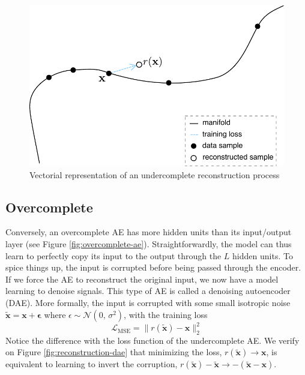 \begin{figure}[!h]
\centering
\includegraphics[scale=0.55]{figures/reconstruction}
\caption[Vectorial representation of undercomplete AE]{Vectorial representation of an undercomplete reconstruction process}
\label{fig:reconstruction}
\end{figure}

\subsection*{Overcomplete}
Conversely, an overcomplete AE has more hidden units than its input/output layer (see Figure \ref{fig:overcomplete-ae}). Straightforwardly, the model can thus learn to perfectly copy its input to the output through the $L$ hidden units. To spice things up, the input is corrupted before being passed through the encoder. If we force the AE to reconstruct the original input, we now have a model learning to denoise signals. This type of AE is called a denoising autoencoder (DAE). More formally, the input is corrupted with some small isotropic noise $\tilde{\mathbf{x}} = \mathbf{x} + \mathbf{\epsilon}$ where $\epsilon \sim \mathcal{N}(0,\,\sigma^{2})$, with the training loss 
\begin{equation}
\mathcal{L}_{\text{MSE}} = \lVert r(\tilde{\mathbf{x}}) - \mathbf{x} \rVert_2^2
\end{equation}
Notice the difference with the loss function of the undercomplete AE. We verify on Figure \ref{fig:reconstruction-dae} that minimizing the loss, $r(\tilde{\mathbf{x}}) \rightarrow \mathbf{x}$, is equivalent to learning to invert the corruption, $r(\tilde{\mathbf{x}}) - \tilde{\mathbf{x}} \rightarrow -(\tilde{\mathbf{x}} - \mathbf{x})$.

